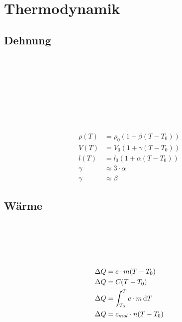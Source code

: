 
\section{Thermodynamik}

\subsection{Dehnung}

\begin{boxleft}
\\
\\
\\
\\
\\
\\
\\
\end{boxleft}\begin{boxrightshaded}
\begin{align*}
\rho(T)&=\rho_0(1-\beta(T-T_0))\\
V(T)&=V_0(1+\gamma(T-T_0))\\
l(T)&=l_0(1+\alpha(T-T_0))\\
\gamma&\approx 3\cdot \alpha\\
\gamma&\approx \beta
\end{align*}
\end{boxrightshaded}

\subsection{Wärme}

\begin{boxleft}
\\
\\
\\
\\
\end{boxleft}\begin{boxrightshaded}
\begin{align*}
\Delta Q&=c\cdot m(T-T_0)\\
\Delta Q&=C(T-T_0)\\
\Delta Q&=\int_{T_0}^T c\cdot m \mathop{}\!\mathrm{d} T\\
\Delta Q&=c_{mol}\cdot n(T-T_0)
\end{align*}
\end{boxrightshaded}

